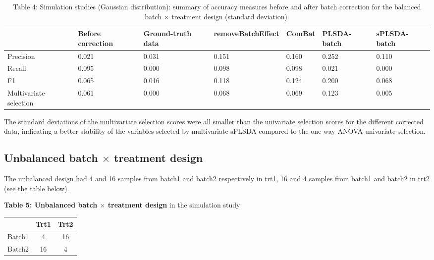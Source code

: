 \documentclass[
]{book}
\begin{document}
\begin{table}

\caption{\label{tab:unnamed-chunk-102}Table 4: Simulation studies (Gaussian distribution): summary of accuracy measures before and after batch correction for the balanced batch × treatment design (standard deviation).}
\centering
\begin{tabular}[t]{l|l|l|l|l|l|l}
\hline
  & Before correction & Ground-truth data & removeBatchEffect & ComBat & PLSDA-batch & sPLSDA-batch\\
\hline
Precision & 0.021 & 0.031 & 0.151 & 0.160 & 0.252 & 0.110\\
\hline
Recall & 0.095 & 0.000 & 0.098 & 0.098 & 0.021 & 0.000\\
\hline
F1 & 0.065 & 0.016 & 0.118 & 0.124 & 0.200 & 0.068\\
\hline
Multivariate selection & 0.061 & 0.000 & 0.068 & 0.069 & 0.123 & 0.005\\
\hline
\end{tabular}
\end{table}

The standard deviations of the multivariate selection scores were all smaller than the univariate selection scores for the different corrected data, indicating a better stability of the variables selected by multivariate sPLSDA compared to the one-way ANOVA univariate selection.

\hypertarget{unbalanced-batch-times-treatment-design}{%
\subsection{\texorpdfstring{Unbalanced batch \(\times\) treatment design}{Unbalanced batch \textbackslash times treatment design}}\label{unbalanced-batch-times-treatment-design}}

The unbalanced design had 4 and 16 samples from batch1 and batch2 respectively in trt1, 16 and 4 samples from batch1 and batch2 in trt2 (see the table below).

\textbf{Table 5: Unbalanced batch \(\times\) treatment design} in the simulation study

\begin{longtable}[]{@{}ccc@{}}
\toprule()
& Trt1 & Trt2 \\
\midrule()
\endhead
Batch1 & 4 & 16 \\
Batch2 & 16 & 4 \\
\bottomrule()
\end{longtable}
\end{document}
